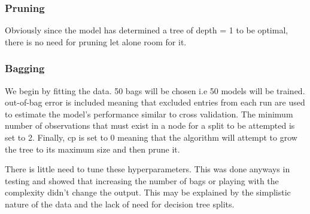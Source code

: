 \documentclass[
]{article}
\newenvironment{Shaded}{\begin{snugshade}}{\end{snugshade}}
\newcommand{\AttributeTok}[1]{\textcolor[rgb]{0.13,0.29,0.53}{#1}}
\newcommand{\CommentTok}[1]{\textcolor[rgb]{0.56,0.35,0.01}{\textit{#1}}}
\newcommand{\ConstantTok}[1]{\textcolor[rgb]{0.56,0.35,0.01}{#1}}
\newcommand{\DecValTok}[1]{\textcolor[rgb]{0.00,0.00,0.81}{#1}}
\newcommand{\FunctionTok}[1]{\textcolor[rgb]{0.13,0.29,0.53}{\textbf{#1}}}
\newcommand{\NormalTok}[1]{#1}
\newcommand{\OtherTok}[1]{\textcolor[rgb]{0.56,0.35,0.01}{#1}}
\newcommand{\SpecialCharTok}[1]{\textcolor[rgb]{0.81,0.36,0.00}{\textbf{#1}}}
\newcommand{\StringTok}[1]{\textcolor[rgb]{0.31,0.60,0.02}{#1}}
\begin{document}
\subsubsection{Pruning}\label{pruning}

Obviously since the model has determined a tree of depth = 1 to be
optimal, there is no need for pruning let alone room for it.

\subsubsection{Bagging}\label{bagging}

We begin by fitting the data. 50 bags will be chosen i.e 50 models will
be trained. out-of-bag error is included meaning that excluded entries
from each run are used to estimate the model's performance similar to
cross validation. The minimum number of observations that must exist in
a node for a split to be attempted is set to 2. Finally, cp is set to 0
meaning that the algorithm will attempt to grow the tree to its maximum
size and then prune it.

There is little need to tune these hyperparameters. This was done
anyways in testing and showed that increasing the number of bags or
playing with the complexity didn't change the output. This may be
explained by the simplistic nature of the data and the lack of need for
decision tree splits.

\begin{Shaded}
\end{Shaded}
\end{document}
